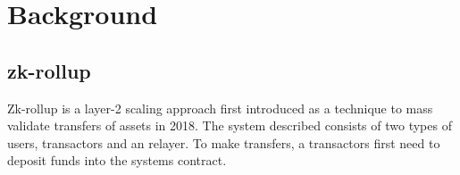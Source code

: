 \documentclass[11pt,twoside,a4paper,final]{book}
\begin{document}
\section{Background}




\subsection{zk-rollup}
Zk-rollup \cite{vbuterin_2018} is a layer-2 scaling approach first introduced as a technique to mass validate transfers of assets in 2018. The system described consists of two types of users, transactors and an relayer. To make transfers, a transactors first need to deposit funds into the systems contract. 
\end{document}
